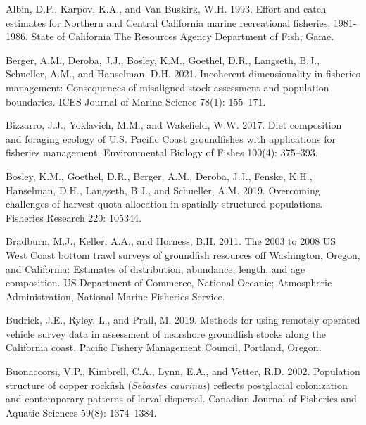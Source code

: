 \documentclass[11pt,
  english,
  a4paper,
]{article}
\newlength{\cslhangindent}
\newenvironment{CSLReferences}[2] %
 {%
  \setlength{\parindent}{0pt}
  \ifodd #1 \everypar{\setlength{\hangindent}{\cslhangindent}}\ignorespaces\fi
  \ifnum #2 > 0
  \setlength{\parskip}{#2\baselineskip}
  \fi
 }%
 {}
\begin{document}
\leavevmode\tagmcend\tagstructend


\hypertarget{refs}{}
\begin{CSLReferences}{1}{0}
\leavevmode{}%
Albin, D.P., Karpov, K.A., and Van Buskirk, W.H. 1993. Effort and catch estimates for {Northern} and {Central} {California} marine recreational fisheries, 1981-1986. State of California The Resources Agency Department of Fish; Game.

\leavevmode{}%
Berger, A.M., Deroba, J.J., Bosley, K.M., Goethel, D.R., Langseth, B.J., Schueller, A.M., and Hanselman, D.H. 2021. Incoherent dimensionality in fisheries management: Consequences of misaligned stock assessment and population boundaries. ICES Journal of Marine Science 78(1): 155--171.

\leavevmode{}%
Bizzarro, J.J., Yoklavich, M.M., and Wakefield, W.W. 2017. Diet composition and foraging ecology of {U}.{S}. {Pacific} {Coast} groundfishes with applications for fisheries management. Environmental Biology of Fishes 100(4): 375--393.

\leavevmode{}%
Bosley, K.M., Goethel, D.R., Berger, A.M., Deroba, J.J., Fenske, K.H., Hanselman, D.H., Langseth, B.J., and Schueller, A.M. 2019. Overcoming challenges of harvest quota allocation in spatially structured populations. Fisheries Research 220: 105344.

\leavevmode{}%
Bradburn, M.J., Keller, A.A., and Horness, B.H. 2011. The 2003 to 2008 {US} {West} {Coast} bottom trawl surveys of groundfish resources off {Washington}, {Oregon}, and {California}: Estimates of distribution, abundance, length, and age composition. US Department of Commerce, National Oceanic; Atmospheric Administration, National Marine Fisheries Service.

\leavevmode{}%
Budrick, J.E., Ryley, L., and Prall, M. 2019. Methods for using remotely operated vehicle survey data in assessment of nearshore groundfish stocks along the {California} coast. Pacific Fishery Management Council, Portland, Oregon.

\leavevmode{}%
Buonaccorsi, V.P., Kimbrell, C.A., Lynn, E.A., and Vetter, R.D. 2002. Population structure of copper rockfish (\emph{{Sebastes} caurinus}) reflects postglacial colonization and contemporary patterns of larval dispersal. Canadian Journal of Fisheries and Aquatic Sciences 59(8): 1374--1384.


\end{CSLReferences}
\end{document}
